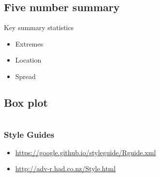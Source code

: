 \documentclass{beamer}
\begin{document}
\subsection{Five number summary}
\begin{frame}

Key summary statistics 
\begin{itemize}
\item Extremes
\item Location
\item Spread
\end{itemize}

\end{frame}

\subsection{Box plot}
\begin{frame}
\end{frame}

\section{}
\begin{frame}
\frametitle{Style Guides}

\begin{itemize}
\item \url{https://google.github.io/styleguide/Rguide.xml}
\item \url{http://adv-r.had.co.nz/Style.html}
\end{itemize}


\end{frame}


\end{document}
